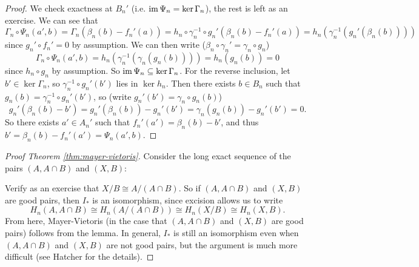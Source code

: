 \begin{proof}
  We check exactness at $B_n'$ (i.e. $\operatorname{im} \Psi_n = \ker \Gamma_n$), the rest is left
  as an exercise. We can see that
  \[
    \Gamma_n \circ \Psi_n(a', b)
    = \Gamma_n(\beta_n(b) - f_n'(a))
    = h_n \circ \gamma_n^{-1} \circ g_n'(\beta_n(b) - f_n'(a))
    = h_n(\gamma_n^{-1}(g_n'(\beta_n(b))))
  \]
  since $g_n' \circ f_n' = 0$ by assumption. We can
  then write ($\beta_n \circ \gamma_n' = \gamma_n \circ g_n$)
  \[
    \Gamma_n \circ \Psi_n(a', b)
    = h_n(\gamma_n^{-1}(\gamma_n(g_n(b))))
    = h_n(g_n(b))
    = 0
  \]
  since $h_n \circ g_n$ by assumption. So
  $\operatorname{im} \Psi_n \subseteq \ker \Gamma_n$. For the
  reverse inclusion, let $b' \in \ker \Gamma_n$, so
  $\gamma_n^{-1} \circ g_n'(b')$ lies in
  $\ker h_n$. Then there exists $b \in B_n$ such that
  $g_n(b) = \gamma_n^{-1} \circ g_n'(b')$, so
  (write $g_n'(b') = \gamma_n \circ g_n(b)$)
  \[
    g_n'(\beta_n(b) - b')
    = g_n'(\beta_n(b)) -  g_n'(b')
    = \gamma_n(g_n(b)) - g_n'(b')
    = 0.
  \]
  So there exists $a' \in A_n'$ such that
  $f_n'(a') = \beta_n(b) - b'$, and thus
  $b' = \beta_n(b) - f_n'(a') = \Psi_n(a', b)$.
\end{proof}

\begin{proof}[Proof Theorem \ref{thm:mayer-vietoris}]
  Consider the long exact sequence of the pairs
  $(A, A \cap B)$ and $(X, B)$:
  \begin{center}
  \end{center}
  Verify as an exercise that $X / B \cong A / (A \cap B)$.
  So if $(A, A \cap B)$ and $(X, B)$ are good pairs, then
  $I_*$ is an isomorphism, since excision allows us to
  write
  \[
    H_n(A, A \cap B) \cong H_n(A / (A \cap B))
    \cong H_n(X / B) \cong H_n(X, B).
  \]
  From here, Mayer-Vietoris
  (in the case that $(A, A \cap B)$ and
  $(X, B)$ are good pairs) follows from the
  lemma. In general, $I_*$ is
  still an isomorphism even when
  $(A, A \cap B)$ and $(X, B)$ are not good pairs,
  but the argument is much more difficult (see Hatcher
  for the details).
\end{proof}

